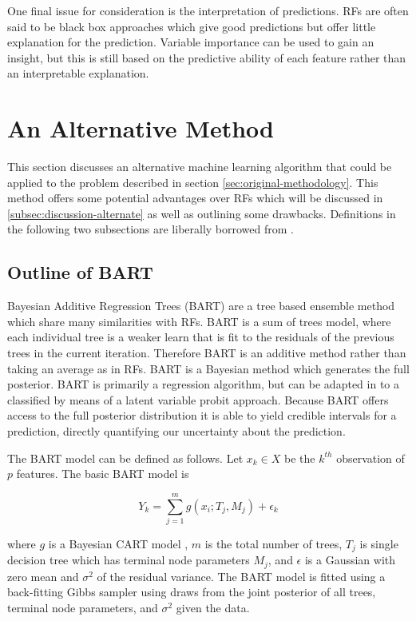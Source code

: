 \documentclass[journal]{IEEEtran}
\begin{document}
One final issue for consideration is the interpretation of predictions. RFs are often said to be black box approaches which give good predictions but offer little explanation for the prediction. Variable importance can be used to gain an insight, but this is still based on the predictive ability of each feature rather than an interpretable explanation.

\section{An Alternative Method}
\label{sec:alternate-method}
This section discusses an alternative machine learning algorithm that could be applied to the problem described in section \ref{sec:original-methodology}. This method offers some potential advantages over RFs which will be discussed in \ref{subsec:discussion-alternate} as well as outlining some drawbacks. Definitions in the following two subsections are liberally borrowed from \cite{hernandez2015bayesian, chipman2010bart}.

\subsection{Outline of BART}
Bayesian Additive Regression Trees (BART) \cite{chipman2010bart} are a tree based ensemble method which share many similarities with RFs. BART is a sum of trees model, where each individual tree is a weaker learn that is fit to the residuals of the previous trees in the current iteration. Therefore BART is an additive method rather than taking an average as in RFs. BART is a Bayesian method which generates the full posterior. BART is primarily a regression algorithm, but can be adapted in to a classified by means of a latent variable probit approach. Because BART offers access to the full posterior distribution it is able to yield credible intervals for a prediction, directly quantifying our uncertainty about the prediction. 

The BART model can be defined as follows. Let $x_k \in X$ be the $k^{th}$ observation of $p$ features. The basic BART model is

\begin{equation}
	Y_k = \sum_{j=1}^{m} g(x_i; T_j, M_j) + \epsilon_k
\end{equation}

where $g$ is a Bayesian CART model \cite{chipman1998bayesian}, $m$ is the total number of trees, $T_j$ is single decision tree which has terminal node parameters $M_j$, and $\epsilon$ is a Gaussian with zero mean and $\sigma^2$ of the residual variance. The BART model is fitted using a back-fitting Gibbs sampler using draws from the joint posterior of all trees, terminal node parameters, and $\sigma^2$ given the data.
\end{document}
